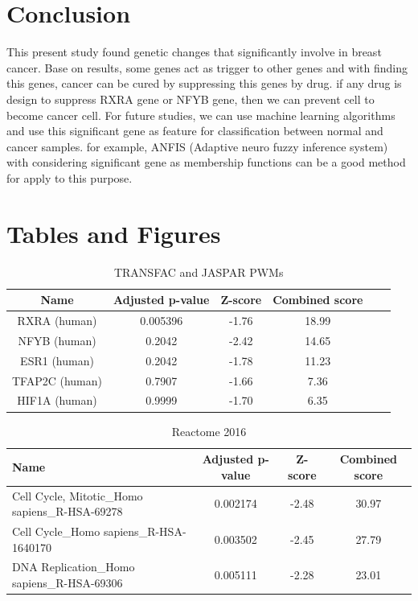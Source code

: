\documentclass[journal, a4paper]{IEEEtran}
\begin{document}
	\section{Conclusion}
    This present study found genetic changes that significantly involve in breast cancer. Base on results, some genes act as trigger to other genes and with finding this genes, cancer can be cured by suppressing this genes by drug. if any drug is design to suppress RXRA gene or NFYB gene, then we can prevent cell to become cancer cell.
    For future studies, we can use machine learning algorithms and use this significant gene as feature for classification between normal and cancer samples. for example, ANFIS (Adaptive neuro fuzzy inference system) with considering significant gene as membership functions can be a good method for apply to this purpose.
	\section{Tables and Figures}
    \begin{table}[!hbt]
		\begin{center}
		\caption{TRANSFAC and JASPAR PWMs}
		\label{tab:simParameters}
		\begin{tabular}{
		|c|c|c|c|c|c|}
			\hline
			Name & Adjusted p-value & Z-score & Combined score\\
			\hline
			RXRA (human) & 0.005396 & -1.76	& 18.99\\
			\hline
            NFYB (human) & 0.2042	& -2.42 &14.65\\
            \hline
            ESR1 (human) & 0.2042	& -1.78 & 11.23\\
            \hline
            TFAP2C (human) & 0.7907	& -1.66 & 7.36\\
            \hline
            HIF1A (human) & 0.9999	& -1.70	& 6.35\\
			\hline
		\end{tabular}
		\end{center}
	\end{table}
	
	\begin{table}[!hbt]
		\begin{center}
		\caption{Reactome 2016}
		\label{tab:simParameters}
		\begin{tabular}{
		|p{3cm}|c|c|c|}
			\hline
			Name & Adjusted p-value & Z-score & Combined score\\
			\hline
            Cell Cycle, Mitotic_Homo sapiens_R-HSA-69278 & 0.002174 & -2.48	& 30.97\\
            \hline
	        Cell Cycle_Homo sapiens_R-HSA-1640170 &	0.003502 & -2.45	& 27.79\\
	        \hline
            DNA Replication_Homo sapiens_R-HSA-69306 &	0.005111 & -2.28 & 23.01\\
            \hline
		\end{tabular}
		\end{center}
	\end{table}
	
\end{document}
